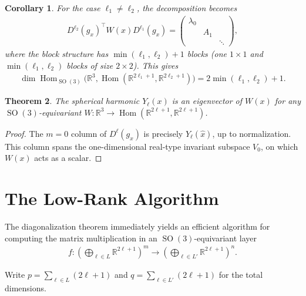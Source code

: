 \documentclass[a4paper, 12pt]{article}
\newcommand{\Hom}{\operatorname{Hom}}
\newcommand{\R}{\mathbb{R}}
\newcommand{\SO}{\operatorname{SO}(3)}
\newtheorem{theorem}{Theorem}[section]
\newtheorem{corollary}[theorem]{Corollary}
\theoremstyle{definition}
\begin{document}
\begin{corollary}
For the case $\ell_1 \neq \ell_2$, the decomposition becomes
\begin{align*}
	D^{\ell_2}(g_x)^{\top} W(x) D^{\ell_1}(g_x) = \begin{pmatrix} \lambda_0 & & \\ & A_1 & \\ & & \ddots \end{pmatrix},
\end{align*}
where the block structure has $\min(\ell_1, \ell_2) + 1$ blocks (one $1 \times 1$ and $\min(\ell_1, \ell_2)$ blocks of size $2 \times 2$). This gives
\begin{align*}
	\dim \Hom_{\SO}\bigl(\R^3, \Hom(\R^{2\ell_1+1}, \R^{2\ell_2+1})\bigr) = 2\min(\ell_1, \ell_2) + 1.
\end{align*}
\end{corollary}

\begin{theorem}
The spherical harmonic $Y_{\ell}(x)$ is an eigenvector of $W(x)$ for any $\SO$-equivariant $W : \R^3 \to \Hom(\R^{2\ell+1}, \R^{2\ell+1})$.
\end{theorem}

\begin{proof}
The $m = 0$ column of $D^{\ell}(g_x)$ is precisely $Y_{\ell}(\hat{x})$, up to normalization. This column spans the one-dimensional real-type invariant subspace $V_0$, on which $W(x)$ acts as a scalar.
\end{proof}


\section{The Low-Rank Algorithm}

The diagonalization theorem immediately yields an efficient algorithm for computing the matrix multiplication in an $\SO$-equivariant layer
\begin{align*}
	f : \left( \bigoplus_{\ell \in L} \R^{2\ell+1} \right)^m \to \left( \bigoplus_{\ell \in L'} \R^{2\ell+1} \right)^n.
\end{align*}

Write $p = \sum_{\ell \in L} (2\ell + 1)$ and $q = \sum_{\ell \in L'} (2\ell + 1)$ for the total dimensions.
\end{document}
